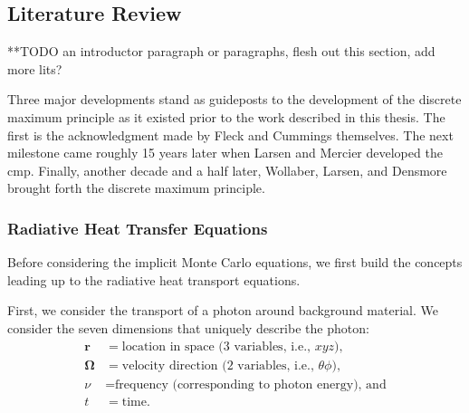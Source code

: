 
\subsection{Literature Review}
 **TODO an introductor paragraph or paragraphs, flesh out this section, add more lits?

Three major developments stand as guideposts to the development of the discrete maximum principle as it existed prior to the work described in this thesis.  The first is the acknowledgment made by Fleck and Cummings themselves.  The next milestone came roughly 15 years later when Larsen and Mercier developed the \gls{cmp}.  Finally, another decade and a half later, Wollaber, Larsen, and Densmore brought forth the discrete maximum principle.

\subsubsection{Radiative Heat Transfer Equations}
Before considering the implicit Monte Carlo equations, we first build the concepts leading up to the radiative heat transport equations.

First, we consider the transport of a photon around background material.  We consider the seven dimensions that uniquely describe the photon:
\begin{align}
\mathbf{r} &= \mbox{location in space (3 variables, i.e., $x y z$)},\\
\mathbf{\Omega} &= \mbox{velocity direction (2 variables, i.e., $\theta \phi$)},\\
\nu &= \mbox{frequency (corresponding to photon energy), and}\\
t &= \mbox{time}.
\end{align}


